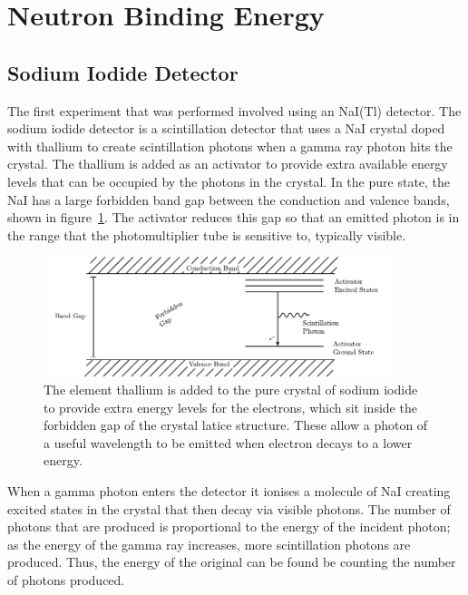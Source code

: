
\section{Neutron Binding Energy} %
\label{sec:neutron_binding_energy}

\subsection{Sodium Iodide Detector} %
\label{ssub:sodium_iodide_detector}
The first experiment that was performed involved using an NaI(Tl) detector. The sodium iodide detector is a scintillation detector that uses a NaI crystal doped with thallium to create scintillation photons when a gamma ray photon hits the crystal. The thallium is added as an activator to provide extra available energy levels that can be occupied by the photons in the crystal. In the pure state, the NaI has a large forbidden band gap between the conduction and valence bands, shown in figure~\ref{fig:thaliumactivator}. The activator reduces this gap so that an emitted photon is in the range that the photomultiplier tube is sensitive to, typically visible.
\begin{figure}[ht]
	\centering
	\includegraphics[width=0.9\textwidth]{NaIbands.pdf}
	\caption{The element thallium is added to the pure crystal of sodium iodide to provide extra energy levels for the electrons, which sit inside the forbidden gap of the crystal latice structure. These allow a photon of a useful wavelength to be emitted when electron decays to a lower energy.\label{fig:thaliumactivator}}
\end{figure}

When a gamma photon enters the detector it ionises a molecule of NaI creating excited states in the crystal that then decay via visible photons. The number of photons that are produced is proportional to the energy of the incident photon; as the energy of the gamma ray increases, more scintillation photons are produced. Thus, the energy of the original can be found be counting the number of photons produced. 

